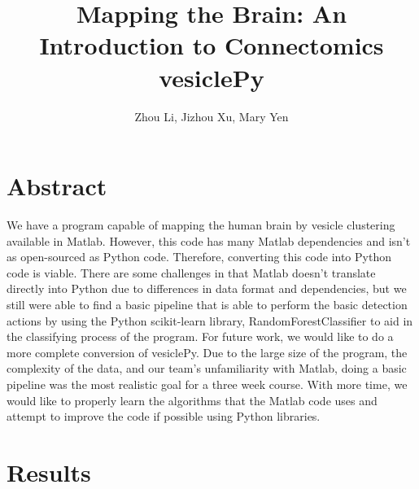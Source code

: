 \documentclass[11pt]{article} %
\title{Mapping the Brain: An Introduction to Connectomics\\vesiclePy}
\author{Zhou Li, Jizhou Xu, Mary Yen}
\begin{document}
\maketitle

\section{Abstract}

We have a program capable of mapping the human brain by vesicle clustering available in Matlab. However, this code has many Matlab dependencies and isn't as open-sourced as Python code. Therefore, converting this code into Python code is viable. There are some challenges in that Matlab doesn't translate directly into Python due to differences in data format and dependencies, but we still were able to find a basic pipeline that is able to perform the basic detection actions by using the Python scikit-learn library, RandomForestClassifier to aid in the classifying process of the program. For future work, we would like to do a more complete conversion of vesiclePy. Due to the large size of the program, the complexity of the data, and our team's unfamiliarity with Matlab, doing a basic pipeline was the most realistic goal for a three week course. With more time, we would like to properly learn the algorithms that the Matlab code uses and attempt to improve the code if possible using Python libraries.

\section{Results}
\end{document}
